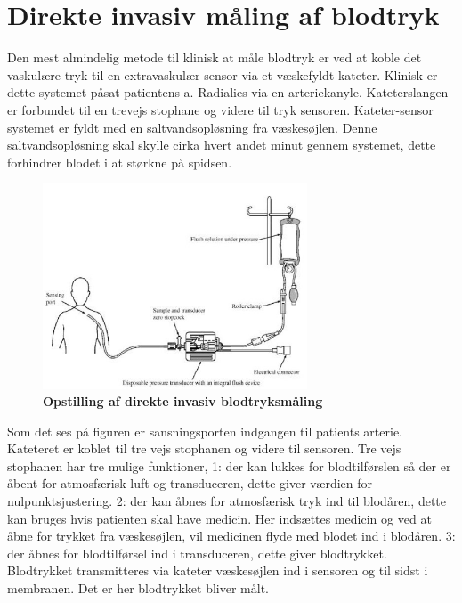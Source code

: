 \section{Direkte invasiv måling af blodtryk}
Den mest almindelig metode til klinisk at måle blodtryk er ved at koble det vaskulære tryk til en extravaskulær sensor via et væskefyldt kateter. Klinisk er dette systemet påsat patientens a. Radialies via en arteriekanyle. Kateterslangen er forbundet til en trevejs stophane og videre til tryk sensoren. Kateter-sensor systemet er fyldt med en saltvandsopløsning fra væskesøjlen. Denne saltvandsopløsning skal skylle cirka hvert andet minut gennem systemet, dette forhindrer blodet i at størkne på spidsen.
\begin{figure}[H]
\includegraphics[width =0.7\textwidth , center]{billeder/kateter}
\caption{\textbf{Opstilling af direkte invasiv blodtryksmåling}}
\end{figure}
Som det ses på figuren er sansningsporten indgangen til patients arterie. Kateteret er koblet til tre vejs stophanen og videre til sensoren. Tre vejs stophanen har tre mulige funktioner, 1: der kan lukkes for blodtilførslen så der er åbent for atmosfærisk luft og transduceren, dette giver værdien for nulpunktsjustering. 2: der kan åbnes for atmosfærisk tryk ind til blodåren, dette kan bruges hvis patienten skal have medicin. Her indsættes medicin og ved at åbne for trykket fra væskesøjlen, vil medicinen flyde med blodet ind i blodåren. 3: der åbnes for blodtilførsel ind i transduceren, dette giver blodtrykket. Blodtrykket transmitteres via kateter væskesøjlen ind i sensoren og til sidst i membranen. Det er her blodtrykket bliver målt. 
